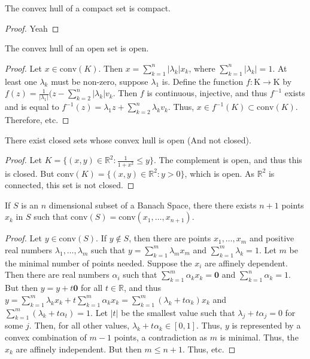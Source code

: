 \documentclass[crop=false,class=book,oneside]{standalone}
\begin{document}
            \begin{theorem}
            The convex hull of a compact set is compact.
            \end{theorem}
            \begin{proof}
            Yeah
            \end{proof}
            \begin{theorem}
            The convex hull of an open set is open.
            \end{theorem}
            \begin{proof}
            Let $x\in \textrm{conv}(K)$. Then $x=\sum_{k=1}^{n}|\lambda_k| x_k$, where $\sum_{k=1}^{n}|\lambda_k| = 1$. At least one $\lambda_k$ must be non-zero, suppose $\lambda_1$ is. Define the function $f:\textrm{K}\rightarrow \textrm{K}$ by $f(z) = \frac{1}{|\lambda_1|}(z-\sum_{k=2}^{n}|\lambda_k|v_k$. Then $f$ is continuous, injective, and thus $f^{-1}$ exists and is equal to $f^{-1}(z) = \lambda_1 z +\sum_{k=2}^{n}\lambda_k v_k$. Thus, $x\in f^{-1}(K)\subset\textrm{conv}(K)$. Therefore, etc. 
            \end{proof}
            \begin{theorem}
            There exist closed sets whose convex hull is open (And not closed).
            \end{theorem}
            \begin{proof}
            Let $K = \{(x,y)\in \mathbb{R}^2:\frac{1}{1+x^2}\leq y\}$. The complement is open, and thus this is closed. But $\textrm{conv}(K) = \{(x,y)\in \mathbb{R}^2:y>0\}$, which is open. As $\mathbb{R}^2$ is connected, this set is not closed.
            \end{proof}
            \begin{theorem}
            If $S$ is an $n$ dimensional subset of a Banach Space, there there exists $n+1$ points $x_k$ in $S$ such that $\textrm{conv}(S) = \textrm{conv}(x_1,\hdots, x_{n+1})$.
            \end{theorem}
            \begin{proof}
            Let $y\in \textrm{conv}(S)$. If $y\notin S$, then there are points $x_1,\hdots, x_m$ and positive real numbers $\lambda_1,\hdots, \lambda_m$ such that $y=\sum_{k=1}^{m}\lambda_m x_m$ and $\sum_{k=1}^{m}\lambda_k = 1$. Let $m$ be the minimal number of points needed. Suppose the $x_i$ are affinely dependent. Then there are real numbers $\alpha_i$ such that $\sum_{k=1}^{m}\alpha_k x_k = \mathbf{0}$ and $\sum_{k=1}^{n}\alpha_k =1$. But then $y = y+t\mathbf{0}$ for all $t\in \mathbb{R}$, and thus $y = \sum_{k=1}^{m}\lambda_k x_k + t\sum_{k=1}^{m}\alpha_k x_k = \sum_{k=1}^{m}(\lambda_k + t\alpha_k)x_k$ and $\sum_{k=1}^{m}(\lambda_k+t\alpha_t) = 1$. Let $|t|$ be the smallest value such that $\lambda_j + t\alpha_j = 0$ for some $j$. Then, for all other values, $\lambda_k + t\alpha_k \in [0,1]$. Thus, $y$ is represented by a convex combination of $m-1$ points, a contradiction as $m$ is minimal. Thus, the $x_k$ are affinely independent. But then $m \leq n+1$. Thus, etc.
            \end{proof}
\end{document}
